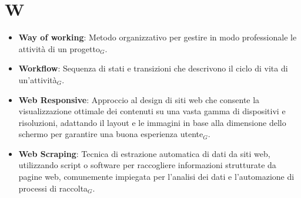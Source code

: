 \section{W}
\begin{itemize}
    \item \textbf{Way of working}: Metodo organizzativo per gestire in modo professionale le attività di un progetto$_G$.
    \item \textbf{Workflow}: Sequenza di stati e transizioni che descrivono il ciclo di vita di un’attività$_G$.
    \item \textbf{Web Responsive}: Approccio al design di siti web che consente la visualizzazione ottimale dei contenuti su una vasta gamma di dispositivi e risoluzioni, adattando il layout e le immagini in base alla dimensione dello schermo per garantire una buona esperienza utente$_G$.
    \item \textbf{Web Scraping}: Tecnica di estrazione automatica di dati da siti web, utilizzando script o software per raccogliere informazioni strutturate da pagine web, comunemente impiegata per l'analisi dei dati e l'automazione di processi di raccolta$_G$.
\end{itemize}
